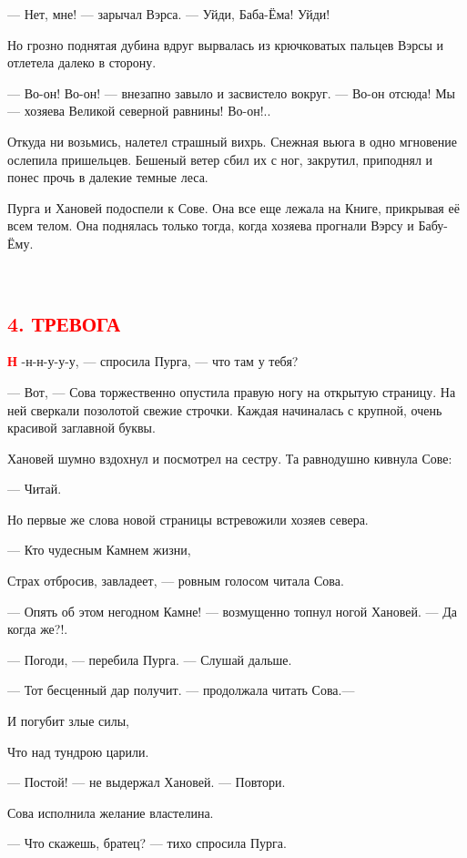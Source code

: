 \documentclass[oneside,final,14pt]{extreport}
\begin{document}
	— Нет, мне! — зарычал Вэрса. — Уйди, Баба-Ёма! Уйди!
	
	Но грозно поднятая дубина вдруг вырвалась из крючковатых пальцев Вэрсы и отлетела далеко в сторону.
	
	— Во-он! Во-он! — внезапно завыло и засвистело вокруг. — Во-он отсюда! Мы — хозяева Великой северной равнины! Во-он!..
	
	Откуда ни возьмись, налетел страшный вихрь. Снежная вьюга в одно мгновение ослепила пришельцев. Бешеный ветер сбил их с ног, закрутил, приподнял и понес прочь в далекие темные леса.
	
	Пурга и Хановей подоспели к Сове. Она все еще лежала на Книге, прикрывая её всем телом. Она поднялась только тогда, когда хозяева прогнали Вэрсу и Бабу-Ёму.
	
	\
	{%
		\centering
		\subsection*{\textcolor{red}{4. ТРЕВОГА}}
	}
	
	\lettrine[findent=0pt]{\textbf{\textcolor{red}{Н}}}{} -н-н-у-у-у, — спросила Пурга, — что там у тебя?
	
	\qquad  	 — Вот, — Сова торжественно опустила правую ногу на открытую страницу. На ней сверкали позолотой свежие строчки. Каждая начиналась с крупной, очень красивой заглавной буквы.
	
	Хановей шумно вздохнул и посмотрел на сестру. Та равнодушно кивнула Сове:
	
	— Читай.
	
	Но первые же слова новой страницы встревожили хозяев севера.
	
	— Кто чудесным Камнем жизни,
	
	Страх отбросив, завладеет, — ровным голосом читала Сова.
	
	— Опять об этом негодном Камне! — возмущенно топнул ногой Хановей. — Да когда же?!.
	
	— Погоди, — перебила Пурга. — Слушай дальше.
	
	— Тот бесценный дар получит. — продолжала читать Сова.—
	
	И погубит злые силы,
	
	Что над тундрою царили.
	
	— Постой! — не выдержал Хановей. — Повтори.
	
	Сова исполнила желание властелина.
	
	— Что скажешь, братец? — тихо спросила Пурга.
	
\end{document}
